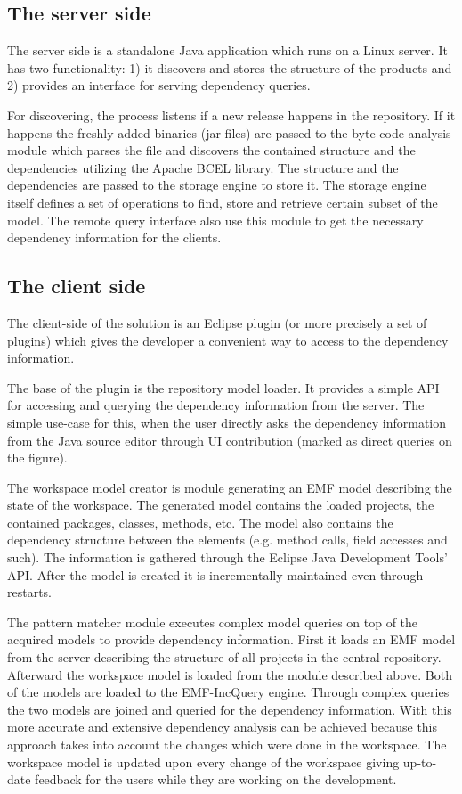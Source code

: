 \subsection{The server side}
The server side is a standalone Java application which runs on a Linux server.
It has two functionality: 1) it discovers and stores the structure of the
products and 2) provides an interface for serving dependency queries. 

For discovering, the process listens if a new release happens in the repository.
If it happens the freshly added binaries (jar files) are passed to the byte code
analysis module which parses the file and discovers the contained structure and
the dependencies utilizing the Apache BCEL library.  The structure and the
dependencies are passed to the storage engine to store it. The storage engine
itself defines a set of operations to find, store and retrieve certain subset of
the model. The remote query interface also use this module to get the necessary 
dependency information for the clients.

\subsection{The client side}
The client-side of the solution is an Eclipse plugin (or more precisely a set of
plugins) which gives the developer a convenient way to access to the dependency
information.

The base of the plugin is the repository model loader. It provides a simple API
for accessing and querying the dependency information from the server. The
simple use-case for this, when the user directly asks the dependency information
from the Java source editor through UI contribution (marked as direct queries on
the figure).

The workspace model creator is module generating an EMF model describing the
state of the workspace. The generated model contains the loaded projects, the
contained packages, classes, methods, etc. The model also contains the
dependency structure between the elements (e.g. method calls, field accesses and
such). The information is gathered through the Eclipse Java Development Tools'
API. After the model is created it is incrementally maintained even through 
restarts.

The pattern matcher module executes complex model queries on top of the acquired
models to provide dependency information. First it loads an EMF model from the
server describing the structure of all projects in the central repository.
Afterward the workspace model is loaded from the module described above. Both of
the models are loaded to the EMF-IncQuery engine. Through complex queries the two
models are joined and queried for the dependency information. With this more 
accurate and extensive dependency analysis can be achieved because this approach
takes into account the changes which were done in the workspace. The workspace 
model is updated upon every change of the workspace giving up-to-date feedback 
for the users while they are working on the development. 

